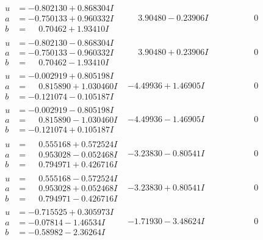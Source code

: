 \documentclass[1p]{elsarticle_modified}
\theoremstyle{definition}
\begin{document}
$$\begin{array}{c|c|c}
\begin{aligned}
u &= -0.802130 + 0.868304 I \\
a &= -0.750133 + 0.960332 I \\
b &= \phantom{-}0.70462 + 1.93410 I\end{aligned}
 & \phantom{-}3.90480 - 0.23906 I & \phantom{-0.000000 } 0 \\ \hline\begin{aligned}
u &= -0.802130 - 0.868304 I \\
a &= -0.750133 - 0.960332 I \\
b &= \phantom{-}0.70462 - 1.93410 I\end{aligned}
 & \phantom{-}3.90480 + 0.23906 I & \phantom{-0.000000 } 0 \\ \hline\begin{aligned}
u &= -0.002919 + 0.805198 I \\
a &= \phantom{-}0.815890 + 1.030460 I \\
b &= -0.121074 - 0.105187 I\end{aligned}
 & -4.49936 + 1.46905 I & \phantom{-0.000000 } 0 \\ \hline\begin{aligned}
u &= -0.002919 - 0.805198 I \\
a &= \phantom{-}0.815890 - 1.030460 I \\
b &= -0.121074 + 0.105187 I\end{aligned}
 & -4.49936 - 1.46905 I & \phantom{-0.000000 } 0 \\ \hline\begin{aligned}
u &= \phantom{-}0.555168 + 0.572524 I \\
a &= \phantom{-}0.953028 - 0.052468 I \\
b &= \phantom{-}0.794971 + 0.426716 I\end{aligned}
 & -3.23830 - 0.80541 I & \phantom{-0.000000 } 0 \\ \hline\begin{aligned}
u &= \phantom{-}0.555168 - 0.572524 I \\
a &= \phantom{-}0.953028 + 0.052468 I \\
b &= \phantom{-}0.794971 - 0.426716 I\end{aligned}
 & -3.23830 + 0.80541 I & \phantom{-0.000000 } 0 \\ \hline\begin{aligned}
u &= -0.715525 + 0.305973 I \\
a &= -0.07814 - 1.46534 I \\
b &= -0.58982 - 2.36264 I\end{aligned}
 & -1.71930 - 3.48624 I & \phantom{-0.000000 } 0 \\ \hline\begin{aligned}

\end{aligned}
\end{array}$$
\end{document}
